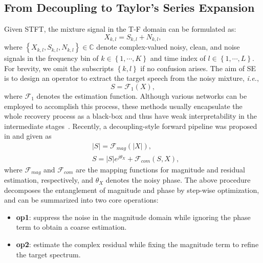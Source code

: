 \documentclass{article}
\begin{document}
\subsection{From Decoupling to Taylor's Series Expansion}
Given STFT, the mixture signal in the T-F domain can be formulated as:
\begin{equation}
\label{eqn1}
X_{k, l} = S_{k, l} + N_{k, l},
\end{equation}
where $\left\{X_{k, l}, S_{k, l}, N_{k, l}\right\}\in\mathbb{C}$ denote complex-valued noisy, clean, and noise signals in the frequency bin of $k\in\left\{1,\cdots, K\right\}$ and time index of $l\in\left\{1,\cdots,L\right\}$. For brevity, we omit the subscripts $\left\{k, l\right\}$ if no confusion arises. The aim of SE is to design an operator to extract the target speech from the noisy mixture, \emph{i.e.}, 
\begin{equation}
\label{eqn2}
S = \mathcal{F}_{1}\left(X\right),
\end{equation}
where $\mathcal{F}_{1}$ denotes the estimation function. Although various networks can be employed to accomplish this process, these methods usually encapsulate the whole recovery process as a black-box and thus have weak interpretability in the intermediate stages~{\cite{tan2020learning,hu2020dccrn}}. Recently, a decoupling-style forward pipeline was proposed in {\cite{li2021two}} and given as
\begin{align}
\label{eqn3}
&\left|S\right| = \mathcal{F}_{mag}\left(\left|X\right|\right),\\
&S = \left|S\right|e^{j\theta_{X}} + \mathcal{F}_{com}\left(S, X\right),
\end{align}
where $\mathcal{F}_{mag}$ and $\mathcal{F}_{com}$ are the mapping functions for magnitude and residual estimation, respectively, and $\theta_{X}$ denotes the noisy phase. The above procedure decomposes the entanglement of magnitude and phase by step-wise optimization, and can be summarized into two core operations: 
\begin{itemize}
	\item \textbf{op1}: suppress the noise in the magnitude domain while ignoring the phase term to obtain a coarse estimation.
	\item \textbf{op2}: estimate the complex residual while fixing the magnitude term to refine the target spectrum.
\end{itemize}
\end{document}
